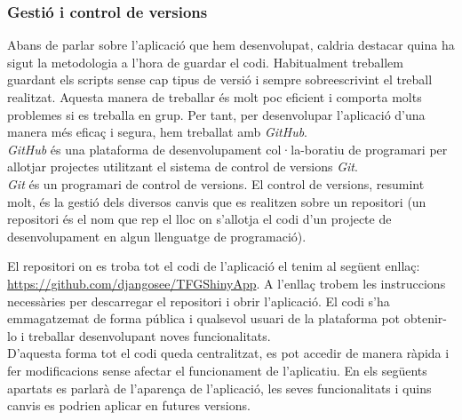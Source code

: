 \documentclass[english]{article}
\begin{document}
\subsubsection{Gestió i control de versions}
Abans de parlar sobre l'aplicació que hem desenvolupat, caldria destacar quina ha sigut la metodologia a l'hora de guardar el codi. Habitualment treballem guardant els scripts sense cap tipus de versió i sempre sobreescrivint el treball realitzat. Aquesta manera de treballar és molt poc eficient i comporta molts problemes si es treballa en grup. Per tant, per desenvolupar l'aplicació d'una manera més efica\c{c} i segura, hem treballat amb \textit{GitHub}.
\\

\textit{GitHub} és una plataforma de desenvolupament col·la-boratiu de programari per allotjar projectes utilitzant el sistema de control de versions \textit{Git}.
\\

\textit{Git} és un programari de control de versions. El control de versions, resumint molt, és la gestió dels diversos canvis que es realitzen sobre un repositori (un repositori és el nom que rep el lloc on s'allotja el codi d'un projecte de desenvolupament en algun llenguatge de programació).

\newpage
El repositori on es troba tot el codi de l'aplicació el tenim al següent enlla\c{c}: \url{https://github.com/djangosee/TFGShinyApp}.
A l'enlla\c{c} trobem les instruccions necessàries per descarregar el repositori i obrir l'aplicació. El codi s'ha emmagatzemat de forma pública i qualsevol usuari de la plataforma pot obtenir-lo i treballar desenvolupant noves funcionalitats.
\\

D'aquesta forma tot el codi queda centralitzat, es pot accedir de manera ràpida i fer modificacions sense afectar el funcionament de l'aplicatiu. En els següents apartats es parlarà de l'aparen\c{c}a de l'aplicació, les seves funcionalitats i quins canvis es podrien aplicar en futures versions.
\end{document}
